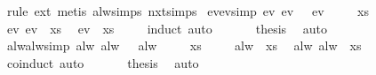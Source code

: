 \begin{isabellebody}
%
\isadelimproof
%
\endisadelimproof
%
\isatagproof
{}\isamarkupfalse%
\ {\isacharparenleft}rule\ ext{\isacharparenright}\ {\isacharparenleft}metis\ alw{\isachardot}simps\ nxt{\isachardot}simps{\isacharparenright}%
\endisatagproof
{\isafoldproof}%
%
\isadelimproof
\isanewline
%
\endisadelimproof
\isanewline
{}\isamarkupfalse%
\ ev{\isacharunderscore}ev{\isacharbrackleft}simp{\isacharbrackright}{\isacharcolon}\ {\isachardoublequoteopen}ev\ {\isacharparenleft}ev\ {\isasymphi}{\isacharparenright}\ {\isacharequal}\ ev\ {\isasymphi}{\isachardoublequoteclose}\isanewline
%
\isadelimproof
%
\endisadelimproof
%
\isatagproof
{}\isamarkupfalse%
{\isacharminus}\isanewline
\ \ \isacommand{{\isacharbraceleft}}\isamarkupfalse%
\isamarkupfalse%
\ xs\isanewline
\ \ \ \isamarkupfalse%
\ {\isachardoublequoteopen}ev\ {\isacharparenleft}ev\ {\isasymphi}{\isacharparenright}\ xs{\isachardoublequoteclose}\ \isamarkupfalse%
\ {\isachardoublequoteopen}ev\ {\isasymphi}\ xs{\isachardoublequoteclose}\isanewline
\ \ \ \isamarkupfalse%
\ induct\ auto\isanewline
\ \ \isacommand{{\isacharbraceright}}\isamarkupfalse%
\isanewline
\ \ \isamarkupfalse%
\ {\isacharquery}thesis\ \isamarkupfalse%
\ auto\isanewline
{}\isamarkupfalse%
%
\endisatagproof
{\isafoldproof}%
%
\isadelimproof
\isanewline
%
\endisadelimproof
\isanewline
{}\isamarkupfalse%
\ alw{\isacharunderscore}alw{\isacharbrackleft}simp{\isacharbrackright}{\isacharcolon}\ {\isachardoublequoteopen}alw\ {\isacharparenleft}alw\ {\isasymphi}{\isacharparenright}\ {\isacharequal}\ alw\ {\isasymphi}{\isachardoublequoteclose}\isanewline
%
\isadelimproof
%
\endisadelimproof
%
\isatagproof
{}\isamarkupfalse%
{\isacharminus}\isanewline
\ \ \isacommand{{\isacharbraceleft}}\isamarkupfalse%
\isamarkupfalse%
\ xs\isanewline
\ \ \ \isamarkupfalse%
\ {\isachardoublequoteopen}alw\ {\isasymphi}\ xs{\isachardoublequoteclose}\ \isamarkupfalse%
\ {\isachardoublequoteopen}alw\ {\isacharparenleft}alw\ {\isasymphi}{\isacharparenright}\ xs{\isachardoublequoteclose}\isanewline
\ \ \ \isamarkupfalse%
\ coinduct\ auto\isanewline
\ \ \isacommand{{\isacharbraceright}}\isamarkupfalse%
\isanewline
\ \ \isamarkupfalse%
\ {\isacharquery}thesis\ \isamarkupfalse%
\ auto\isanewline
{}\isamarkupfalse%
%
\endisatagproof
{\isafoldproof}%
%
\isadelimproof
\isanewline
%
\endisadelimproof

\end{isabellebody}
